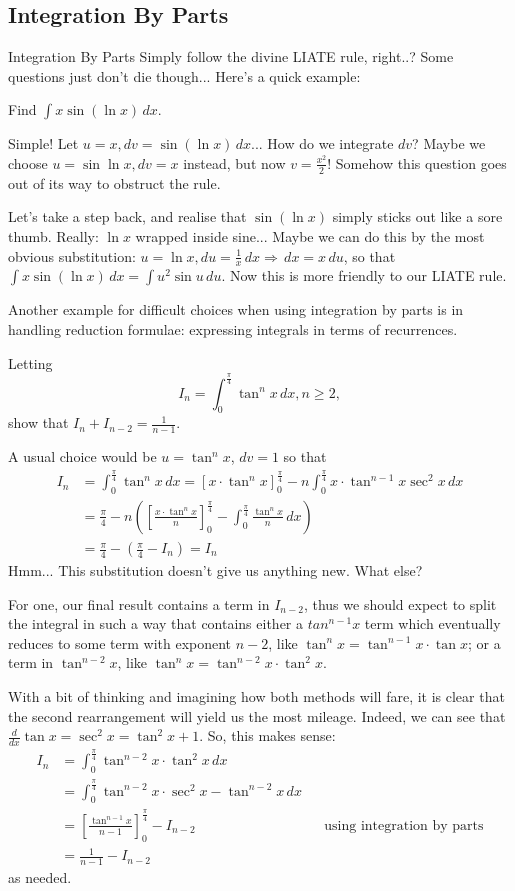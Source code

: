 \documentclass[../jarvis.tex]{subfiles}
\begin{document}
\subsection{Integration By Parts}
{Integration By Parts}
Simply follow the divine LIATE rule, right..? Some questions just don't die though... Here's a quick example:
\begin{example}
Find $\int x\sin{(\ln{x})} \,dx$.
\end{example}
Simple! Let $u=x, dv=\sin{(\ln{x})} \,dx$... How do we integrate $dv$? Maybe we choose $u=\sin{\ln{x}}, dv=x$ instead, but now $v=\frac{x^2}{2}$! Somehow this question goes out of its way to obstruct the rule. 

Let's take a step back, and realise that $\sin{(\ln{x})}$ simply sticks out like a sore thumb. Really: $\ln x$ wrapped inside sine... Maybe we can do this by the most obvious substitution: $u=\ln x, du=\frac{1}{x} \,dx \Longrightarrow \,dx = x\,du$, so that $\int x\sin{(\ln x)} \,dx= \int u^2\sin{u} \,du$. Now this is more friendly to our LIATE rule.

Another example for difficult choices when using integration by parts is in handling reduction formulae: expressing integrals in terms of recurrences.
\begin{example}[Classic]
Letting $$I_n=\int_{0}^{\frac{\pi}{4}}\tan^n x\,dx, n\geq 2,$$
show that $I_n+I_{n-2}=\frac{1}{n-1}$.
\end{example}
A usual choice would be $u=\tan^n x$, $dv=1$ so that
\begin{align*}
    I_n&=\int_{0}^{\frac{\pi}{4}}\tan^n x \,dx = \left[x\cdot \tan^n x\right]_{0}^{\frac{\pi}{4}}-n\int_{0}^{\frac{\pi}{4}}x\cdot \tan^{n-1} x\sec^2x\,dx \\
    &=\frac{\pi}{4}-n\left(\left[\frac{x\cdot \tan^nx}{n}\right]_{0}^{\frac{\pi}{4}}-\int_{0}^{\frac{\pi}{4}}\frac{\tan^nx}{n}\,dx\right) \\
    &=\frac{\pi}{4}-\left(\frac{\pi}{4}-I_n\right) = I_n
\end{align*}
Hmm... This substitution doesn't give us anything new. What else?

For one, our final result contains a term in $I_{n-2}$, thus we should expect to split the integral in such a way that contains either a $tan^{n-1}x$ term which eventually reduces to some term with exponent $n-2$, like $\tan^nx=\tan^{n-1}x\cdot \tan x$; or a term in $\tan^{n-2}x$, like $\tan^n x=\tan^{n-2}x\cdot \tan^2x$.

With a bit of thinking and imagining how both methods will fare, it is clear that the second rearrangement will yield us the most mileage. Indeed, we can see that $\frac{d}{dx}\tan x=\sec^2x=\tan^2x+1$. So, this makes sense:
\begin{align*}
    I_n&=\int_{0}^{\frac{\pi}{4}}\tan^{n-2}x\cdot \tan^2x \,dx \\
    &=\int_{0}^{\frac{\pi}{4}}\tan^{n-2}x\cdot \sec^2x-\tan^{n-2}x \,dx \\
    &=\left[\frac{\tan^{n-1}x}{n-1}\right]_{0}^{\frac{\pi}{4}}-I_{n-2} &&\text{using integration by parts}\\
    &=\frac{1}{n-1}-I_{n-2}
\end{align*}
as needed.
\end{document}
